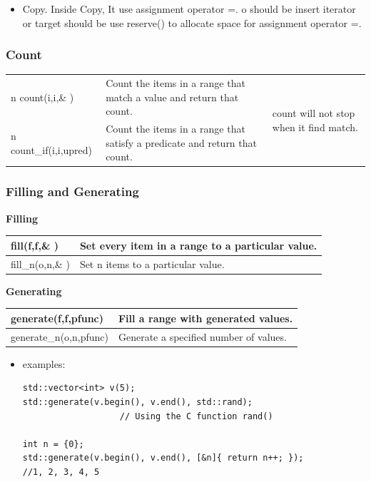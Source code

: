 \documentclass[a4paper,11pt,twoside]{book}
\def\pdfbook{}
\newcommand{\tophline}{\hline }
\newcommand{\bottomhline}{\\ \hline }
\newcommand{\tophline}{ }
\newcommand{\bottomhline}{ }
\begin{document}
\begin{itemize}
\item Copy.  Inside Copy, It use assignment operator =. o should be insert iterator or target should be use reserve() to allocate space for assignment operator =.
\end{itemize}



\subsubsection{Count}
\begin{tabular}{| p{} |p{}|p{}|}
\tophline n count(i,i,\& ) & Count the items in a range that match a value and return that count.& \multirow{2}{*}{ \parbox{0.2\textwidth}{count will not stop when it find match. } }    \\
\ifdefined\pdfbook  \cline{1-2} \fi n count\_if(i,i,upred)  & Count the items in a range that satisfy a predicate and return that count. & \bottomhline
\end{tabular}


\subsubsection{Filling and Generating}
\textbf{Filling} \\
\begin{tabular}{| p{} |p{}|}
\tophline fill(f,f,\& ) & Set every item in a range to a particular value.  \\
\tophline fill\_n(o,n,\& )  & Set n items to a particular value.   \bottomhline
\end{tabular}


\textbf{Generating} \\
\begin{tabular}{| p{} |p{}|}
\tophline generate(f,f,pfunc)  & Fill a range with generated values.   \\
\tophline generate\_n(o,n,pfunc)  & Generate a specified number of values.   \bottomhline
\end{tabular}

\begin{itemize}
\item examples:
\begin{lstlisting}[numbers=none]
std::vector<int> v(5);
std::generate(v.begin(), v.end(), std::rand);
                   // Using the C function rand()

int n = {0};
std::generate(v.begin(), v.end(), [&n]{ return n++; });
//1, 2, 3, 4, 5
\end{lstlisting}

\end{itemize}
\end{document}
